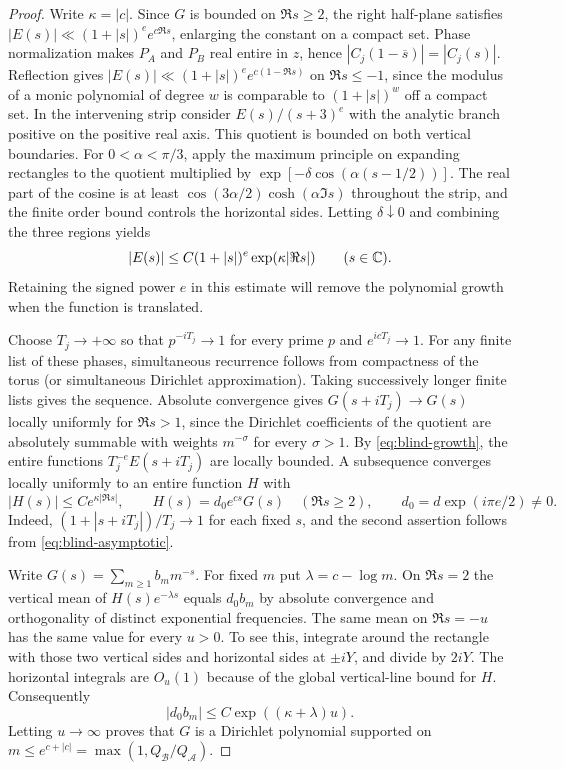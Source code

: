 \begin{proof}
Write $\kappa=|c|$. Since $G$ is bounded on $\Re s\ge 2$, the right half-plane satisfies $|E(s)|\ll (1+|s|)^e e^{c\Re s}$, enlarging the constant on a compact set. Phase normalization makes $P_A$ and $P_B$ real entire in $z$, hence $|C_j(1-\overline s)|=|C_j(s)|$. Reflection gives $|E(s)|\ll (1+|s|)^e e^{c(1-\Re s)}$ on $\Re s\le -1$, since the modulus of a monic polynomial of degree $w$ is comparable to $(1+|s|)^w$ off a compact set. In the intervening strip consider $E(s)/(s+3)^e$ with the analytic branch positive on the positive real axis. This quotient is bounded on both vertical boundaries. For $0<\alpha<\pi/3$, apply the maximum principle on expanding rectangles to the quotient multiplied by $\exp[-\delta\cos(\alpha(s-1/2))]$. The real part of the cosine is at least $\cos(3\alpha/2)\cosh(\alpha\Im s)$ throughout the strip, and the finite order bound controls the horizontal sides. Letting $\delta\downarrow0$ and combining the three regions yields
\begin{equation}\label{eq:blind-growth}
 |E(s)|\le C(1+|s|)^e\exp(\kappa|\Re s|)\qquad(s\in\mathbb C).
\end{equation}
Retaining the signed power $e$ in this estimate will remove the polynomial growth when the function is translated.

Choose $T_j\to+\infty$ so that $p^{-iT_j}\to1$ for every prime $p$ and $e^{icT_j}\to1$. For any finite list of these phases, simultaneous recurrence follows from compactness of the torus (or simultaneous Dirichlet approximation). Taking successively longer finite lists gives the sequence. Absolute convergence gives $G(s+iT_j)\to G(s)$ locally uniformly for $\Re s>1$, since the Dirichlet coefficients of the quotient are absolutely summable with weights $m^{-\sigma}$ for every $\sigma>1$. By \eqref{eq:blind-growth}, the entire functions $T_j^{-e}E(s+iT_j)$ are locally bounded. A subsequence converges locally uniformly to an entire function $H$ with
\[
 |H(s)|\le C e^{\kappa |\Re s|},\qquad
 H(s)=d_0 e^{cs}G(s)\quad(\Re s\ge2),\qquad d_0=d\exp(i\pi e/2)\ne0.
\]
Indeed, $(1+|s+iT_j|)/T_j\to1$ for each fixed $s$, and the second assertion follows from \eqref{eq:blind-asymptotic}.

Write $G(s)=\sum_{m\ge1} b_m m^{-s}$. For fixed $m$ put $\lambda=c-\log m$. On $\Re s=2$ the vertical mean of $H(s)e^{-\lambda s}$ equals $d_0 b_m$ by absolute convergence and orthogonality of distinct exponential frequencies. The same mean on $\Re s=-u$ has the same value for every $u>0$. To see this, integrate around the rectangle with those two vertical sides and horizontal sides at $\pm iY$, and divide by $2iY$. The horizontal integrals are $O_u(1)$ because of the global vertical-line bound for $H$. Consequently
\[
 |d_0 b_m|\le C\exp((\kappa+\lambda)u).
\]
Letting $u\to\infty$ proves that $G$ is a Dirichlet polynomial supported on $m\le e^{c+|c|}=\max(1,Q_{\mathcal B}/Q_{\mathcal A})$.


\end{proof}

